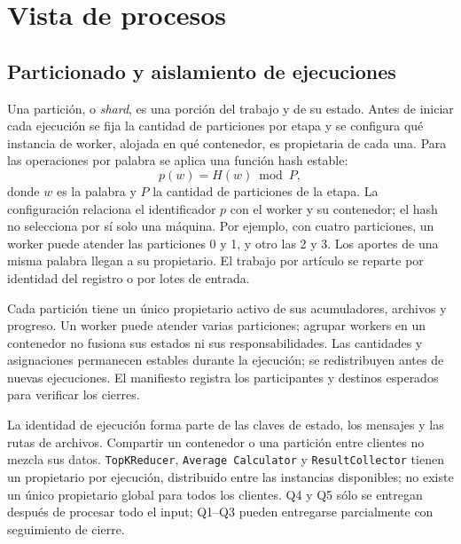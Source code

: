 \section{Vista de procesos}
\label{sec:vista-procesos}

\subsection{Particionado y aislamiento de ejecuciones}
\label{subsec:particionado-aislamiento}
Una partición, o \emph{shard}, es una porción del trabajo y de su estado.
Antes de iniciar cada ejecución se fija la cantidad de particiones por etapa
y se configura qué instancia de worker, alojada en qué contenedor, es
propietaria de cada una. Para las operaciones
por palabra se aplica una función hash estable:
\[
    p(w) = H(w) \bmod P,
\]
donde $w$ es la palabra y $P$ la cantidad de particiones de la etapa. La
configuración relaciona el identificador $p$ con el worker y su contenedor;
el hash no selecciona por sí solo una máquina. Por ejemplo, con cuatro
particiones, un worker puede atender las particiones 0 y 1, y otro las 2 y 3.
Los aportes de una misma palabra llegan a su propietario. El trabajo por
artículo se reparte por identidad del registro o por lotes de entrada.

Cada partición tiene un único propietario activo de sus acumuladores, archivos
y progreso. Un worker puede atender varias particiones; agrupar workers en
un contenedor no fusiona sus estados ni sus responsabilidades. Las cantidades y
asignaciones permanecen estables durante la ejecución; se redistribuyen antes
de nuevas ejecuciones. El manifiesto registra los participantes y destinos
esperados para verificar los cierres.

La identidad de ejecución forma parte de las claves de estado, los mensajes y
las rutas de archivos. Compartir un contenedor o una partición entre clientes
no mezcla sus datos. \texttt{TopKReducer}, \texttt{Average Calculator} y
\texttt{ResultCollector} tienen un propietario por ejecución, distribuido entre
las instancias disponibles; no existe un único propietario global para todos
los clientes. Q4 y Q5 sólo se entregan después de procesar todo el input;
Q1--Q3 pueden entregarse parcialmente con seguimiento de cierre.

